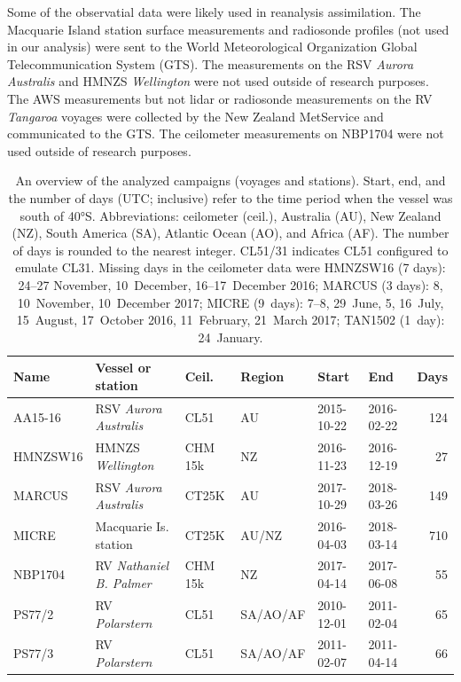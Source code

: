 \documentclass[draft]{agujournal2019}
\begin{document}
Some of the observatial data were likely used in reanalysis assimilation. The Macquarie Island station surface measurements and radiosonde profiles (not used in our analysis) were sent to the World Meteorological Organization Global Telecommunication System (GTS). The measurements on the RSV \textit{Aurora Australis} and HMNZS \textit{Wellington} were not used outside of research purposes. The AWS measurements but not lidar or radiosonde measurements on the RV \textit{Tangaroa} voyages were collected by the New Zealand MetService and communicated to the GTS. The ceilometer measurements on NBP1704 were not used outside of research purposes.

\begin{table}[p!]
\caption{
An overview of the analyzed campaigns (voyages and stations). Start, end, and the number of days (UTC; inclusive) refer to the time period when the vessel was south of 40°S. Abbreviations: ceilometer (ceil.), Australia (AU), New Zealand (NZ), South America (SA), Atlantic Ocean (AO), and Africa (AF). The number of days is rounded to the nearest integer. CL51/31 indicates CL51 configured to emulate CL31. Missing days in the ceilometer data were HMNZSW16 (7 days): 24--27 November, 10~December, 16--17~December 2016; MARCUS (3 days): 8, 10~November, 10~December 2017; MICRE (9~days): 7--8, 29~June, 5, 16~July, 15~August, 17~October 2016, 11~February, 21~March 2017; TAN1502 (1~day): 24~January.
}
\label{tab:voyages}
\centering
\small
\begin{tabular}{llllllr}
\textbf{Name} & \textbf{Vessel or station} & \textbf{Ceil.} & \textbf{Region} & \textbf{Start} & \textbf{End} & \textbf{Days}\\
\hline
AA15-16  & RSV \emph{Aurora Australis}   & CL51    & AU       & 2015-10-22 & 2016-02-22 & 124 \\
HMNZSW16 & HMNZS \emph{Wellington}       & CHM 15k & NZ       & 2016-11-23 & 2016-12-19 & 27 \\
MARCUS   & RSV \emph{Aurora Australis}   & CT25K   & AU       & 2017-10-29 & 2018-03-26 & 149 \\
MICRE    & Macquarie Is. station         & CT25K   & AU/NZ    & 2016-04-03 & 2018-03-14 & 710 \\
NBP1704  & RV \emph{Nathaniel B. Palmer} & CHM 15k & NZ       & 2017-04-14 & 2017-06-08 & 55 \\
PS77/2   & RV \emph{Polarstern}          & CL51    & SA/AO/AF & 2010-12-01 & 2011-02-04 & 65 \\
PS77/3   & RV \emph{Polarstern}          & CL51    & SA/AO/AF & 2011-02-07 & 2011-04-14 & 66 \\

\end{tabular}
\end{table}
\end{document}
